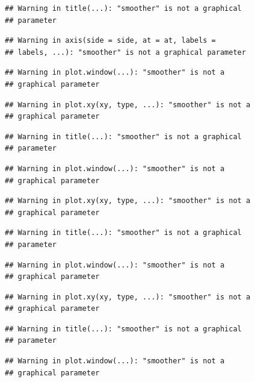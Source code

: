\documentclass[12pt,]{krantz}
\begin{document}
\begin{verbatim}
## Warning in title(...): "smoother" is not a graphical
## parameter
\end{verbatim}

\begin{verbatim}
## Warning in axis(side = side, at = at, labels =
## labels, ...): "smoother" is not a graphical parameter
\end{verbatim}

\begin{verbatim}
## Warning in plot.window(...): "smoother" is not a
## graphical parameter
\end{verbatim}

\begin{verbatim}
## Warning in plot.xy(xy, type, ...): "smoother" is not a
## graphical parameter
\end{verbatim}

\begin{verbatim}
## Warning in title(...): "smoother" is not a graphical
## parameter
\end{verbatim}

\begin{verbatim}
## Warning in plot.window(...): "smoother" is not a
## graphical parameter
\end{verbatim}

\begin{verbatim}
## Warning in plot.xy(xy, type, ...): "smoother" is not a
## graphical parameter
\end{verbatim}

\begin{verbatim}
## Warning in title(...): "smoother" is not a graphical
## parameter
\end{verbatim}

\begin{verbatim}
## Warning in plot.window(...): "smoother" is not a
## graphical parameter
\end{verbatim}

\begin{verbatim}
## Warning in plot.xy(xy, type, ...): "smoother" is not a
## graphical parameter
\end{verbatim}

\begin{verbatim}
## Warning in title(...): "smoother" is not a graphical
## parameter
\end{verbatim}

\begin{verbatim}
## Warning in plot.window(...): "smoother" is not a
## graphical parameter
\end{verbatim}
\end{document}
